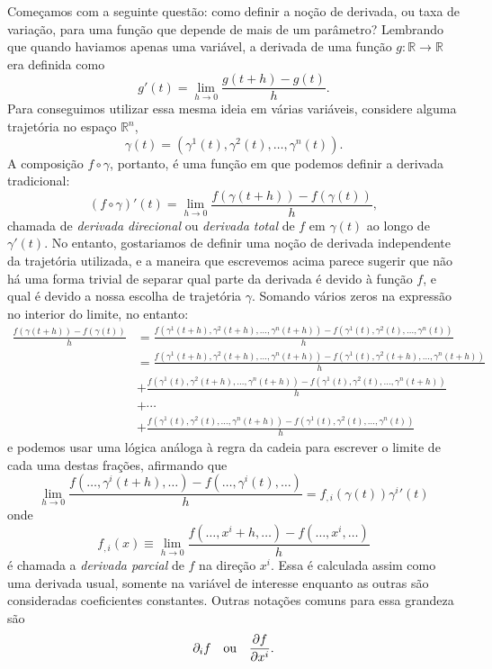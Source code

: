 Começamos com a seguinte questão: como definir a noção de derivada, ou taxa de
variação, para uma função que depende de mais de um parâmetro? Lembrando que
quando haviamos apenas uma variável, a derivada de uma função $g:\mathbb R
\rightarrow\mathbb R$ era definida como
$$g'(t)=\lim\limits_{h\rightarrow0}\frac{g(t+h)-g(t)}{h}.$$
Para conseguimos utilizar essa mesma ideia em várias variáveis, considere alguma
trajetória no espaço $\mathbb R^n$,
$$\gamma(t)=(\gamma^1(t),\gamma^2(t),\dots,\gamma^n(t)).$$
A composição $f\circ\gamma$, portanto, é uma função em que podemos definir a
derivada tradicional:
$$(f\circ\gamma)'(t)=
\lim\limits_{h\rightarrow0}\frac{f(\gamma(t+h))-f(\gamma(t))}{h},$$
chamada de \emph{derivada direcional} ou \emph{derivada total} de $f$ em $\gamma
(t)$ ao longo de $\gamma'(t)$. No entanto, gostariamos de definir uma noção de
derivada independente da trajetória utilizada, e a maneira que escrevemos acima
parece sugerir que não há uma forma trivial de separar qual parte da derivada é
devido à função $f$, e qual é devido a nossa escolha de trajetória $\gamma$.
Somando vários zeros na expressão no interior do limite, no entanto:
\begin{align*}
    \frac{f(\gamma(t+h))-f(\gamma(t))}{h}
    &=\frac{f(\gamma^1(t+h),\gamma^2(t+h),\dots,\gamma^n(t+h))
    -f(\gamma^1(t),\gamma^2(t),\dots,\gamma^n(t))}{h}\\
    &=\frac{f(\gamma^1(t+h),\gamma^2(t+h),\dots,\gamma^n(t+h))
    -f(\gamma^1(t),\gamma^2(t+h),\dots,\gamma^n(t+h))}{h}\\
    &+\frac{f(\gamma^1(t),\gamma^2(t+h),\dots,\gamma^n(t+h))
    -f(\gamma^1(t),\gamma^2(t),\dots,\gamma^n(t+h))}{h}\\
    &+\cdots\\
    &+\frac{f(\gamma^1(t),\gamma^2(t),\dots,\gamma^n(t+h))
    -f(\gamma^1(t),\gamma^2(t),\dots,\gamma^n(t))}{h}
\end{align*}
e podemos usar uma lógica análoga à regra da cadeia para escrever o limite de
cada uma destas frações, afirmando que
$$\lim\limits_{h\rightarrow0}\frac{f(\dots,\gamma^i(t+h),\dots)
-f(\dots,\gamma^i(t),\dots)}{h}=f_{,i}(\gamma(t))\gamma^i{'}(t)$$
onde
$$f_{,i}(x)\equiv\lim\limits_{h\rightarrow0}
\frac{f(\dots,x^i+h,\dots)-f(\dots,x^i,\dots)}{h}$$
é chamada a \emph{derivada parcial} de $f$ na direção $x^i$. Essa é calculada
assim como uma derivada usual, somente na variável de interesse enquanto as
outras são consideradas coeficientes constantes. Outras notações comuns para
essa grandeza são
$$\partial_i f\quad\text{ou}\quad\pd{f}{x^i}{}.$$
